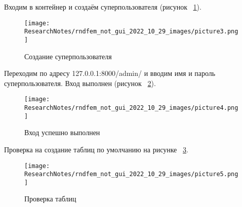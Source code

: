 	Входим в контейнер и создаём суперпользователя (рисунок ~\ref{picture3}).
\begin{figure}[!ht]
  \centering
  \texttt{[image: ResearchNotes/rndfem\_not\_gui\_2022\_10\_29\_images/picture3.png]}
  \caption{Создание суперпользователя}
  \label{picture3}
\end{figure}

	Переходим по адресу \textsf{127.0.0.1:8000/admin/} и вводим имя и пароль суперпользователя. Вход выполнен (рисунок ~\ref{picture4}).
\begin{figure}[!ht]
  \centering
  \texttt{[image: ResearchNotes/rndfem\_not\_gui\_2022\_10\_29\_images/picture4.png]}
  \caption{Вход успешно выполнен}
  \label{picture4}
\end{figure}

	Проверка на создание таблиц по умолчанию на рисунке ~\ref{picture5}.
\begin{figure}[!ht]
  \centering
  \texttt{[image: ResearchNotes/rndfem\_not\_gui\_2022\_10\_29\_images/picture5.png]}
  \caption{Проверка таблиц}
  \label{picture5}
\end{figure}
\noteattributes{}


